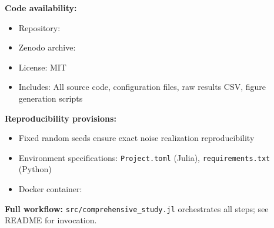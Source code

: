 \textbf{Code availability:}
\begin{itemize}
    \item Repository: 
    \item Zenodo archive: 
    \item License: MIT
    \item Includes: All source code, configuration files, raw results CSV, figure generation scripts
\end{itemize}

\textbf{Reproducibility provisions:}
\begin{itemize}
    \item Fixed random seeds ensure exact noise realization reproducibility
    \item Environment specifications: \texttt{Project.toml} (Julia), \texttt{requirements.txt} (Python)
    \item Docker container: 
\end{itemize}

\textbf{Full workflow:} \texttt{src/comprehensive\_study.jl} orchestrates all steps; see README for invocation.
